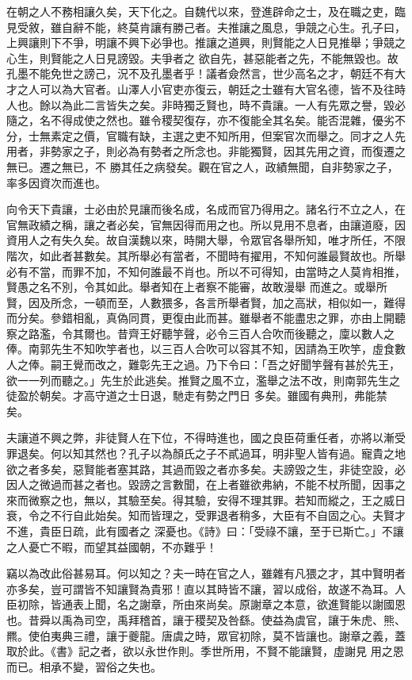 \begin{pinyinscope}
 在朝之人不務相讓久矣，天下化之。自魏代以來，登進辟命之士，及在職之吏，臨見受敘，雖自辭不能，終莫肯讓有勝己者。夫推讓之風息，爭競之心生。孔子曰，上興讓則下不爭，明讓不興下必爭也。推讓之道興，則賢能之人日見推舉；爭競之心生，則賢能之人日見謗毀。夫爭者之
 欲自先，甚惡能者之先，不能無毀也。故孔墨不能免世之謗己，況不及孔墨者乎！議者僉然言，世少高名之才，朝廷不有大才之人可以為大官者。山澤人小官吏亦復云，朝廷之士雖有大官名德，皆不及往時人也。餘以為此二言皆失之矣。非時獨乏賢也，時不貴讓。一人有先眾之譽，毀必隨之，名不得成使之然也。雖令稷契復存，亦不復能全其名矣。能否混雜，優劣不分，士無素定之價，官職有缺，主選之吏不知所用，但案官次而舉之。同才之人先用者，非勢家之子，則必為有勢者之所念也。非能獨賢，因其先用之資，而復遷之無已。遷之無已，不
 勝其任之病發矣。觀在官之人，政績無聞，自非勢家之子，率多因資次而進也。



 向令天下貴讓，士必由於見讓而後名成，名成而官乃得用之。諸名行不立之人，在官無政績之稱，讓之者必矣，官無因得而用之也。所以見用不息者，由讓道廢，因資用人之有失久矣。故自漢魏以來，時開大舉，令眾官各舉所知，唯才所任，不限階次，如此者甚數矣。其所舉必有當者，不聞時有擢用，不知何誰最賢故也。所舉必有不當，而罪不加，不知何誰最不肖也。所以不可得知，由當時之人莫肯相推，賢愚之名不別，令其如此。舉者知在上者察不能審，故敢漫舉
 而進之。或舉所賢，因及所念，一頓而至，人數猥多，各言所舉者賢，加之高狀，相似如一，難得而分矣。參錯相亂，真偽同貫，更復由此而甚。雖舉者不能盡忠之罪，亦由上開聽察之路濫，令其爾也。昔齊王好聽竽聲，必令三百人合吹而後聽之，廩以數人之俸。南郭先生不知吹竽者也，以三百人合吹可以容其不知，因請為王吹竽，虛食數人之俸。嗣王覺而改之，難彰先王之過。乃下令曰：「吾之好聞竽聲有甚於先王，欲一一列而聽之。」先生於此逃矣。推賢之風不立，濫舉之法不改，則南郭先生之徒盈於朝矣。才高守道之士日退，馳走有勢之門日
 多矣。雖國有典刑，弗能禁矣。



 夫讓道不興之弊，非徒賢人在下位，不得時進也，國之良臣荷重任者，亦將以漸受罪退矣。何以知其然也？孔子以為顏氏之子不貳過耳，明非聖人皆有過。寵貴之地欲之者多矣，惡賢能者塞其路，其過而毀之者亦多矣。夫謗毀之生，非徒空設，必因人之微過而甚之者也。毀謗之言數聞，在上者雖欲弗納，不能不杖所聞，因事之來而微察之也，無以，其驗至矣。得其驗，安得不理其罪。若知而縱之，王之威日衰，令之不行自此始矣。知而皆理之，受罪退者稍多，大臣有不自固之心。夫賢才不進，貴臣日疏，此有國者之
 深憂也。《詩》曰：「受祿不讓，至于已斯亡。」不讓之人憂亡不暇，而望其益國朝，不亦難乎！



 竊以為改此俗甚易耳。何以知之？夫一時在官之人，雖雜有凡猥之才，其中賢明者亦多矣，豈可謂皆不知讓賢為貴邪！直以其時皆不讓，習以成俗，故遂不為耳。人臣初除，皆通表上聞，名之謝章，所由來尚矣。原謝章之本意，欲進賢能以謝國恩也。昔舜以禹為司空，禹拜稽首，讓于稷契及咎繇。使益為虞官，讓于朱虎、熊、羆。使伯夷典三禮，讓于夔龍。唐虞之時，眾官初除，莫不皆讓也。謝章之義，蓋取於此。《書》記之者，欲以永世作則。季世所用，不賢不能讓賢，虛謝見
 用之恩而已。相承不變，習俗之失也。




\end{pinyinscope}
